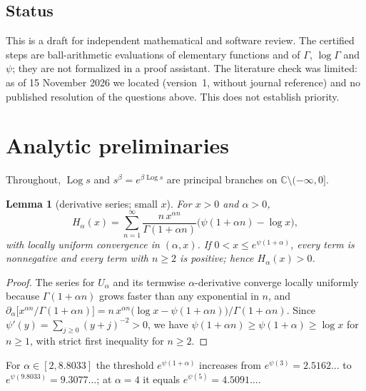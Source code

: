 \documentclass[11pt,a4paper]{article}
\theoremstyle{plain}
\newtheorem{lemma}[theorem]{Lemma}
\theoremstyle{remark}
\newcommand{\C}{\mathbb C}
\DeclareMathOperator{\Log}{Log}
\begin{document}
\subsection{Status}
This is a draft for independent mathematical and software review. The certified steps are
ball-arithmetic evaluations of elementary functions and of $\Gamma$, $\log\Gamma$ and $\psi$; they
are not formalized in a proof assistant. The literature check was limited: as of
15 November 2026 we located \cite{FS} (version~1, without journal reference) and no published
resolution of the questions above. This does not establish priority.

\section{Analytic preliminaries}\label{sec:prelim}
Throughout, $\Log s$ and $s^\beta=e^{\beta\Log s}$ are principal branches on
$\C\setminus(-\infty,0]$.

\begin{lemma}[derivative series; small $x$]\label{lem:small}
For $x>0$ and $\alpha>0$,
\begin{equation}\label{eq:series}
 H_\alpha(x)=\sum_{n=1}^{\infty}\frac{n\,x^{\alpha n}}{\Gamma(1+\alpha n)}
 \bigl(\psi(1+\alpha n)-\log x\bigr),
\end{equation}
with locally uniform convergence in $(\alpha,x)$. If $0<x\le e^{\psi(1+\alpha)}$, every term is
nonnegative and every term with $n\ge2$ is positive; hence $H_\alpha(x)>0$.
\end{lemma}
\begin{proof}
The series for $U_\alpha$ and its termwise $\alpha$-derivative converge locally uniformly because
$\Gamma(1+\alpha n)$ grows faster than any exponential in $n$, and
$\partial_\alpha\bigl[x^{\alpha n}/\Gamma(1+\alpha n)\bigr]
 =n\,x^{\alpha n}\bigl(\log x-\psi(1+\alpha n)\bigr)/\Gamma(1+\alpha n)$.
Since $\psi'(y)=\sum_{j\ge0}(y+j)^{-2}>0$, we have
$\psi(1+\alpha n)\ge\psi(1+\alpha)\ge\log x$ for $n\ge1$, with strict first inequality for $n\ge2$.
\end{proof}

For $\alpha\in[2,8.8033]$ the threshold $e^{\psi(1+\alpha)}$ increases from
$e^{\psi(3)}=2.5162\ldots$ to $e^{\psi(9.8033)}=9.3077\ldots$; at $\alpha=4$ it equals
$e^{\psi(5)}=4.5091\ldots$.
\end{document}
